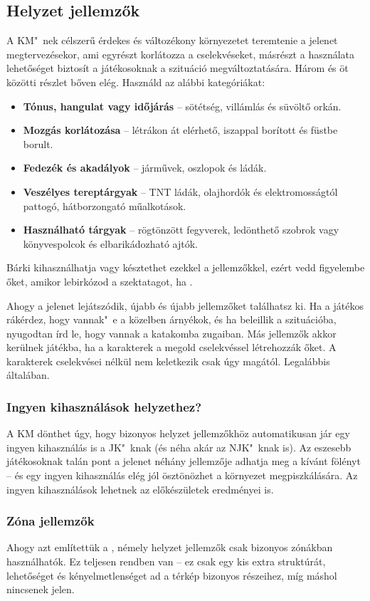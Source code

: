 \subsection{Helyzet jellemzők}

A KM"~nek célszerű érdekes és változékony környezetet teremtenie a jelenet megtervezésekor, ami egyrészt korlátozza a cselekvéseket, másrészt a használata lehetőséget biztosít a játékosoknak a szituáció megváltoztatására. Három és öt közötti részlet bőven elég. Használd az alábbi kategóriákat:

\begin{itemize}
    \item \textbf{Tónus, hangulat vagy időjárás} -- sötétség, villámlás és süvöltő orkán.
    \item \textbf{Mozgás korlátozása} -- létrákon át elérhető, iszappal borított és füstbe borult.
    \item \textbf{Fedezék és akadályok} -- járművek, oszlopok és ládák.
    \item \textbf{Veszélyes tereptárgyak} -- TNT ládák, olajhordók és elektromosságtól pattogó, hátborzongató műalkotások.
    \item \textbf{Használható tárgyak} -- rögtönzött fegyverek, ledönthető szobrok vagy könyvespolcok és elbarikádozható ajtók.
\end{itemize}

Bárki kihasználhatja vagy késztethet ezekkel a jellemzőkkel, ezért vedd figyelembe őket, amikor lebirkózod a szektatagot, ha .

Ahogy a jelenet lejátszódik, újabb és újabb jellemzőket találhatsz ki. Ha a játékos rákérdez, hogy vannak"~e a közelben árnyékok, és ha beleillik a szituációba, nyugodtan írd le, hogy  vannak a katakomba zugaiban. Más jellemzők akkor kerülnek játékba, ha a karakterek a megold cselekvéssel létrehozzák őket. A karakterek cselekvései nélkül nem keletkezik csak úgy  magától. Legalábbis általában.

\subsubsection{Ingyen kihasználások helyzethez?}

A KM dönthet úgy, hogy bizonyos helyzet jellemzőkhöz automatikusan jár egy ingyen kihasználás is a JK"~knak (és néha akár az NJK"~knak is). Az eszesebb játékosoknak talán pont a jelenet néhány jellemzője adhatja meg a kívánt fölényt -- és egy ingyen kihasználás elég jól ösztönözhet a környezet megpiszkálására. Az ingyen kihasználások lehetnek az előkészületek eredményei is.

\subsubsection{Zóna jellemzők}

Ahogy azt említettük a , némely helyzet jellemzők csak bizonyos zónákban használhatók. Ez teljesen rendben van -- ez csak egy kis extra struktúrát, lehetőséget és kényelmetlenséget ad a térkép bizonyos részeihez, míg máshol nincsenek jelen.
